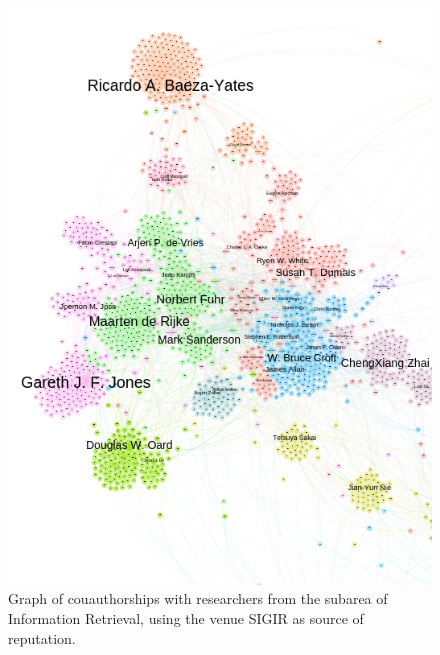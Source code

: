 \documentclass[msc]{ppgccufmg}
\begin{document}
\begin{appendices}
\begin{figure}[h]
    \centering
    \includegraphics[scale=0.6]{fig/sigir}
    \caption{Graph of couauthorships with researchers from the subarea of Information Retrieval, using the venue SIGIR as source of reputation.}
    \label{fig:sigir}
\end{figure}


\end{appendices}
\end{document}
